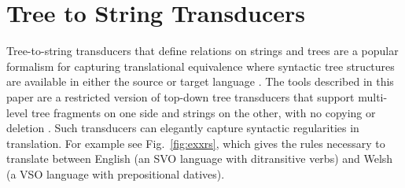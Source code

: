 \documentclass[nofonts]{pbml} %
\begin{document}
\section{Tree to String Transducers}
Tree-to-string transducers that define relations on strings and trees are a popular formalism for capturing translational equivalence where syntactic tree structures are available in either the source or target language \citep{graehl:2008,Galley2004,rounds:1970,thatcher:1970}. The tools described in this paper are a restricted version of top-down tree transducers that support multi-level tree fragments on one side and strings on the other, with no copying or deletion \citep{huang:2006,Cohn2009}. Such transducers can elegantly capture syntactic regularities in translation. For example see Fig.~\ref{fig:exxrs}, which gives the rules necessary to translate between English (an SVO language with ditransitive verbs) and Welsh (a VSO language with prepositional datives).
\end{document}
